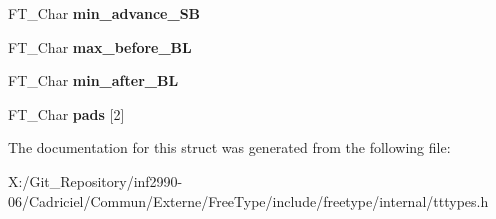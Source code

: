 \begin{DoxyCompactItemize}
\item 
\hypertarget{struct_t_t___s_bit___line_metrics_rec___ad4f4578a99ce4537bd454bf47a60074c}{F\-T\-\_\-\-Char {\bfseries min\-\_\-advance\-\_\-\-S\-B}}\label{struct_t_t___s_bit___line_metrics_rec___ad4f4578a99ce4537bd454bf47a60074c}

\item 
\hypertarget{struct_t_t___s_bit___line_metrics_rec___a63599b9adfc64d1927b6a8b46d9ce08d}{F\-T\-\_\-\-Char {\bfseries max\-\_\-before\-\_\-\-B\-L}}\label{struct_t_t___s_bit___line_metrics_rec___a63599b9adfc64d1927b6a8b46d9ce08d}

\item 
\hypertarget{struct_t_t___s_bit___line_metrics_rec___a553dfe17d98fd138430545f4f77195c5}{F\-T\-\_\-\-Char {\bfseries min\-\_\-after\-\_\-\-B\-L}}\label{struct_t_t___s_bit___line_metrics_rec___a553dfe17d98fd138430545f4f77195c5}

\item 
\hypertarget{struct_t_t___s_bit___line_metrics_rec___a9f98e5de39f252b6ebfb3e94120d1dbc}{F\-T\-\_\-\-Char {\bfseries pads} \mbox{[}2\mbox{]}}\label{struct_t_t___s_bit___line_metrics_rec___a9f98e5de39f252b6ebfb3e94120d1dbc}

\end{DoxyCompactItemize}


The documentation for this struct was generated from the following file\-:\begin{DoxyCompactItemize}
\item 
X\-:/\-Git\-\_\-\-Repository/inf2990-\/06/\-Cadriciel/\-Commun/\-Externe/\-Free\-Type/include/freetype/internal/tttypes.\-h\end{DoxyCompactItemize}
